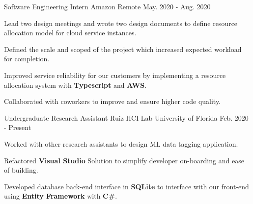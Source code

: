 


\begin{cventries}

	
		\cventry
	{Software Engineering Intern} %
	{Amazon} %
	{Remote} %
	{May. 2020 - Aug. 2020} %
	{ %
		\begin{cvitems}
			\setlength{\itemindent}{.125in}
			\item {Lead two design meetings and wrote two design documents to define resource allocation model for cloud service instances.}
			\item {Defined the scale and scoped of the project which increased expected workload for completion.}
			\item {Improved service reliability for our customers by implementing a resource allocation system with \textbf{Typescript} and \textbf{AWS}. }
			\item {Collaborated with coworkers to improve and ensure higher code quality.}
		\end{cvitems}
	}
	
	
			\cventry
	{Undergraduate Research Assistant} %
	{Ruiz HCI Lab} %
	{University of Florida} %
	{Feb. 2020 - Present} %
	{ %
		\begin{cvitems}
			\setlength{\itemindent}{.125in}
			\item {Worked with other research assistants to design ML data tagging application.}
			\item {Refactored \textbf{Visual Studio} Solution to simplify  developer on-boarding and ease of building.}
			\item {Developed  database back-end interface in \textbf{SQLite} to interface with our front-end using \textbf{Entity Framework} with \textbf{C\#}.}
		\end{cvitems}
	}
	

\end{cventries}
